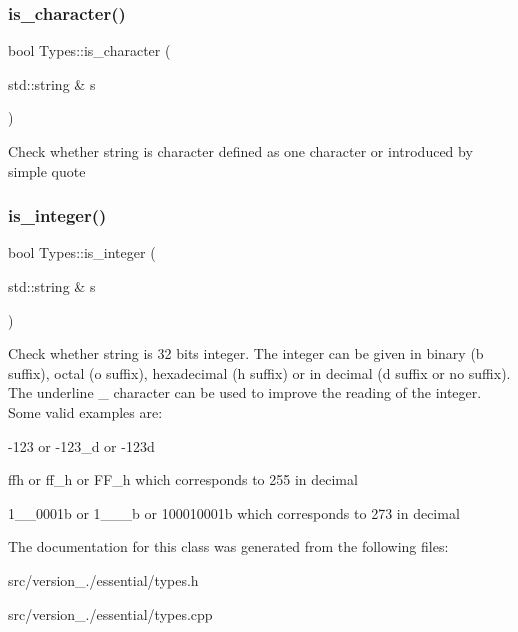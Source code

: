 \subsubsection{\texorpdfstring{is\+\_\+character()}{is\_character()}}
{\footnotesize\ttfamily bool Types\+::is\+\_\+character (\begin{DoxyParamCaption}\item[{std\+::string \&}]{s }\end{DoxyParamCaption})\hspace{0.3cm}{\ttfamily [static]}}

Check whether string is character defined as one character or introduced by simple quote {\ttfamily \textquotesingle{}} \mbox{\label{classez_1_1essential_1_1Types_a76ecf067792f8e456977bb3238868a6c}} 
\subsubsection{\texorpdfstring{is\+\_\+integer()}{is\_integer()}}
{\footnotesize\ttfamily bool Types\+::is\+\_\+integer (\begin{DoxyParamCaption}\item[{std\+::string \&}]{s }\end{DoxyParamCaption})\hspace{0.3cm}{\ttfamily [static]}}

Check whether string is 32 bits integer. The integer can be given in binary (\textquotesingle{}b\textquotesingle{} suffix), octal (\textquotesingle{}o\textquotesingle{} suffix), hexadecimal (\textquotesingle{}h\textquotesingle{} suffix) or in decimal (\textquotesingle{}d\textquotesingle{} suffix or no suffix). The underline \textquotesingle{}\+\_\+\textquotesingle{} character can be used to improve the reading of the integer. Some valid examples are\+: 
\begin{DoxyItemize}
\item -\/123 or -\/123\+\_\+d or -\/123d 
\item ffh or ff\+\_\+h or F\+F\+\_\+h which corresponds to 255 in decimal 
\item 1\+\_\+\_\+0001b or 1\+\_\+\_\+\_\+b or 100010001b which corresponds to 273 in decimal 
\end{DoxyItemize}

The documentation for this class was generated from the following files\+:\begin{DoxyCompactItemize}
\item 
src/version\+\_./essential/types.\+h\item 
src/version\+\_./essential/types.\+cpp\end{DoxyCompactItemize}
